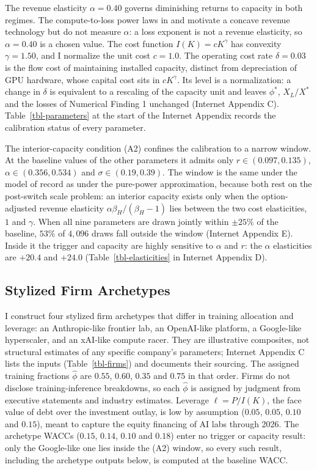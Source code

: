 \documentclass[
  11pt,
  letterpaper,
]{scrartcl}
\begin{document}
The revenue elasticity \(\alpha = 0.40\) governs diminishing returns to
capacity in both regimes. The compute-to-loss power laws in
\citet{kaplan2020scaling} and \citet{hoffmann2022training} motivate a
concave revenue technology but do not measure \(\alpha\): a loss
exponent is not a revenue elasticity, so \(\alpha = 0.40\) is a chosen
value. The cost function \(I(K) = cK^\gamma\) has convexity
\(\gamma = 1.50\), and I normalize the unit cost \(c = 1.0\). The
operating cost rate \(\delta = 0.03\) is the flow cost of maintaining
installed capacity, distinct from depreciation of GPU hardware, whose
capital cost sits in \(cK^\gamma\). Its level is a normalization: a
change in \(\delta\) is equivalent to a rescaling of the capacity unit
and leaves \(\phi^*\), \(X_L/X^*\) and the losses of Numerical Finding 1
unchanged (Internet Appendix C). Table~\ref{tbl-parameters} at the start
of the Internet Appendix records the calibration status of every
parameter.

The interior-capacity condition (A2) confines the calibration to a
narrow window. At the baseline values of the other parameters it admits
only \(r \in (0.097, 0.135)\), \(\alpha \in (0.356, 0.534)\) and
\(\sigma \in (0.19, 0.39)\). The window is the same under the model of
record as under the pure-power approximation, because both rest on the
post-switch scale problem: an interior capacity exists only when the
option-adjusted revenue elasticity \(\alpha\beta_H/(\beta_H - 1)\) lies
between the two cost elasticities, \(1\) and \(\gamma\). When all nine
parameters are drawn jointly within \(\pm 25\%\) of the baseline,
\(53\%\) of \(4{,}096\) draws fall outside the window (Internet Appendix
E). Inside it the trigger and capacity are highly sensitive to
\(\alpha\) and \(r\): the \(\alpha\) elasticities are \(+20.4\) and
\(+24.0\) (Table~\ref{tbl-elasticities} in Internet Appendix D).

\subsection{Stylized Firm Archetypes}\label{stylized-firm-archetypes}

I construct four stylized firm archetypes that differ in training
allocation and leverage: an Anthropic-like frontier lab, an OpenAI-like
platform, a Google-like hyperscaler, and an xAI-like compute racer. They
are illustrative composites, not structural estimates of any specific
company's parameters; Internet Appendix C lists the inputs
(Table~\ref{tbl-firms}) and documents their sourcing. The assigned
training fractions \(\hat{\phi}\) are \(0.55\), \(0.60\), \(0.35\) and
\(0.75\) in that order. Firms do not disclose training-inference
breakdowns, so each \(\hat{\phi}\) is assigned by judgment from
executive statements and industry estimates. Leverage \(\ell = P/I(K)\),
the face value of debt over the investment outlay, is low by assumption
(\(0.05\), \(0.05\), \(0.10\) and \(0.15\)), meant to capture the equity
financing of AI labs through 2026. The archetype WACCs (\(0.15\),
\(0.14\), \(0.10\) and \(0.18\)) enter no trigger or capacity result:
only the Google-like one lies inside the (A2) window, so every such
result, including the archetype outputs below, is computed at the
baseline WACC.
\end{document}
